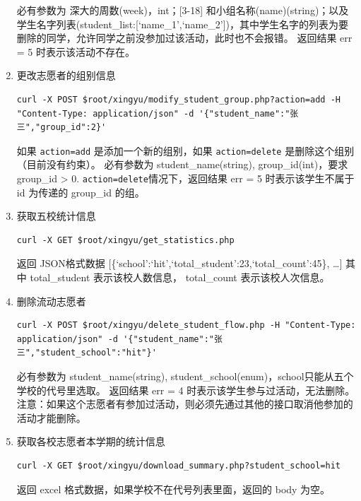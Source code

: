 \documentclass[]{ctexart}
\begin{document}
\begin{enumerate}
必有参数为 深大的周数(week)，int；{[}3-18{]}
和小组名称(name)(string)；以及学生名字列表(student\_list:{[}`name\_1',`name\_2'{]})，其中学生名字的列表为要
删除的同学，允许同学之前没参加过该活动，此时也不会报错。 返回结果 err =
5 时表示该活动不存在。

\item
  更改志愿者的组别信息

\begin{lstlisting}
curl -X POST $root/xingyu/modify_student_group.php?action=add -H "Content-Type: application/json" -d '{"student_name":"张三","group_id":2}'
\end{lstlisting}

如果 \texttt{action=add} 是添加一个新的组别，如果 \texttt{action=delete}
是删除这个组别（目前没有约束）。 必有参数为 student\_name(string),
group\_id(int)，要求 group\_id \textgreater{} 0.
\texttt{action=delete}情况下，返回结果 err = 5 时表示该学生不属于 id
为传递的 group\_id 的组。

\item
  获取五校统计信息

\begin{lstlisting}
curl -X GET $root/xingyu/get_statistics.php
\end{lstlisting}

返回 JSON格式数据
{[}\{`school':`hit',`total\_student':23,`total\_count':45\}, \ldots{}{]}
其中 total\_student 表示该校人数信息， total\_count 表示该校人次信息。

\item
  删除流动志愿者
\begin{lstlisting}
curl -X POST $root/xingyu/delete_student_flow.php -H "Content-Type: application/json" -d '{"student_name":"张三","student_school":"hit"}'
\end{lstlisting}

必有参数为 student\_name(string),
student\_school(enum)，school只能从五个学校的代号里选取。 返回结果 err =
4 时表示该学生参与过活动，无法删除。
注意：如果这个志愿者有参加过活动，则必须先通过其他的接口取消他参加的活动才能删除。

\item
  获取各校志愿者本学期的统计信息
\begin{lstlisting}
curl -X GET $root/xingyu/download_summary.php?student_school=hit
\end{lstlisting}

返回 excel 格式数据，如果学校不在代号列表里面，返回的 body 为空。
\end{enumerate}
\end{document}
